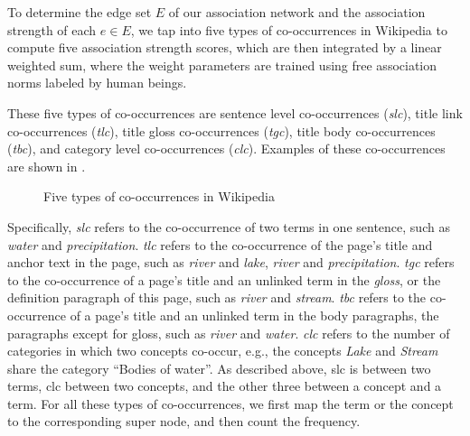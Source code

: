 To determine the edge set $E$ of our association network and the
association strength of each $e \in E$, we tap into five types of
co-occurrences in Wikipedia to compute five association strength scores, which are then integrated by a
linear weighted sum, where the weight parameters are trained 
using free association norms labeled by human beings. 

These five types of co-occurrences are sentence level co-occurrences
({\em slc}), title link co-occurrences ({\em tlc}), title gloss
co-occurrences ({\em tgc}), title body co-occurrences ({\em tbc}), and
category level co-occurrences ({\em clc}). Examples of these
co-occurrences are shown in .

\begin{figure}[htb]
\centering
{}
\caption{Five types of co-occurrences in Wikipedia}
\label{fig:cooccur}
\end{figure}

Specifically, {\em slc} refers to the co-occurrence of two terms in one
sentence, such as {\em water} and {\em precipitation}. 
{\em tlc} refers to the co-occurrence of the page's title and
anchor text in the page, such as {\em river} and {\em lake}, {\em
river} and {\em precipitation}. {\em tgc} refers to the co-occurrence of a
page's title and an unlinked term in the \emph{gloss}, or the
definition paragraph of this page, such as {\em river} and {\em
stream}. {\em tbc} refers to the co-occurrence of a page's title and an
unlinked term in the body paragraphs, the paragraphs except
for gloss, such as {\em river} and
{\em water}. {\em clc} refers to the number of categories in which
two concepts co-occur, 
e.g., the concepts {\em Lake} and {\em Stream} share the category 
``Bodies of water''.
As described above, slc is between two terms, clc between two concepts,
and the other three between a concept and a term. For all these types
of co-occurrences, we first map the term or the concept
to the corresponding super node, and then count the frequency.


